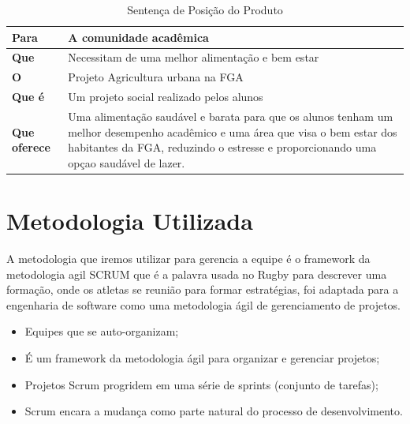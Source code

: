   \begin{table}[!htb]
    \centering
    \begin{tabular}{p{3cm}p{13cm}}
      \toprule
      \textbf{Para}         & A comunidade acadêmica                                                                                \\ \midrule
      \textbf{Que}          & Necessitam de uma melhor alimentação e bem estar                                                      \\ \midrule
      \textbf{O}            & Projeto Agricultura urbana na FGA                                                                     \\ \midrule
      \textbf{Que é}        & Um projeto social realizado pelos alunos                                                              \\ \midrule
      \textbf{Que oferece}  & Uma alimentação saudável e barata para que os alunos tenham um melhor desempenho acadêmico e uma área
                              que visa o bem estar dos habitantes da FGA, reduzindo o estresse e proporcionando uma opçao saudável de lazer.                       \\
      \bottomrule
    \end{tabular}
    \caption{Sentença de Posição do Produto}
  \end{table}


\section{Metodologia Utilizada}

  A metodologia que iremos utilizar para gerencia a equipe é o framework da metodologia agil SCRUM que é a palavra usada no Rugby para
  descrever uma formação, onde os atletas se reunião para formar estratégias, foi adaptada para a engenharia de software como uma
  metodologia ágil de gerenciamento de projetos.

  \begin{itemize}
    \item Equipes que se auto-organizam;
    \item É um framework da metodologia ágil para organizar e gerenciar projetos;
    \item Projetos Scrum progridem em uma série de sprints (conjunto de tarefas);
    \item Scrum encara a mudança como parte natural do processo de desenvolvimento.
  \end{itemize}


